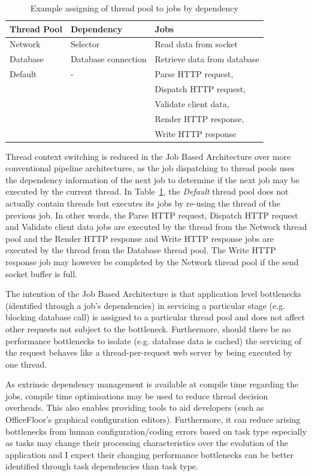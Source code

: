 \documentclass[conference]{ieee/IEEEtran}
\begin{document}
\begin{table}[!t]
\renewcommand{\arraystretch}{1.3}
\caption{Example assigning of thread pool to jobs by dependency}
\label{tab:example_request_thread_pools}
\centering
\begin{tabular}{l||l||l}
\hline
\bfseries Thread Pool & \bfseries Dependency & \bfseries Jobs \\
\hline\hline
Network & Selector & Read data from socket \\
\hline
Database & Database connection & Retrieve data from database \\
\hline
Default & - & Parse HTTP request, \\
& & Dispatch HTTP request, \\
& & Validate client data, \\ 
& & Render HTTP response, \\
& & Write HTTP response \\
\hline
\end{tabular}
\end{table}

Thread context switching is reduced in the Job Based Architecture over more
conventional pipeline architectures, as the job dispatching to thread pools uses
the dependency information of the next job to determine if the next job may be
executed by the current thread.  In
Table~\ref{tab:example_request_thread_pools}, the \textit{Default} thread pool
does not actually contain threads but executes its jobs by re-using the thread
of the previous job.  In other words, the Parse HTTP request, Dispatch HTTP
request and Validate client data jobs are executed by the thread from the
Network thread pool and the Render HTTP response and Write HTTP response jobs
are executed by the thread from the Database thread pool.  The Write HTTP
response job may however be completed by the Network thread pool if the send
socket buffer is full.

The intention of the Job Based Architecture is that application level
bottlenecks (identified through a job's dependencies) in servicing a particular
stage (e.g. blocking database call) is assigned to a particular thread pool and
does not affect other requests not subject to the bottleneck.  Furthermore,
should there be no performance bottlenecks to isolate (e.g. database data is
cached) the servicing of the request behaves like a thread-per-request web
server by being executed by one thread.

As extrinsic dependency management is available at compile time regarding the
jobs, compile time optimisations may be used to reduce thread decision
overheads.  This also enables providing tools to aid developers (such as
OfficeFloor's graphical configuration editors).  Furthermore, it can reduce
arising bottlenecks from human configuration/coding errors based on task type
especially as tasks may change their processing characteristics over the
evolution of the application and I expect their changing performance bottlenecks
can be better identified through task dependencies than task type.
\end{document}
